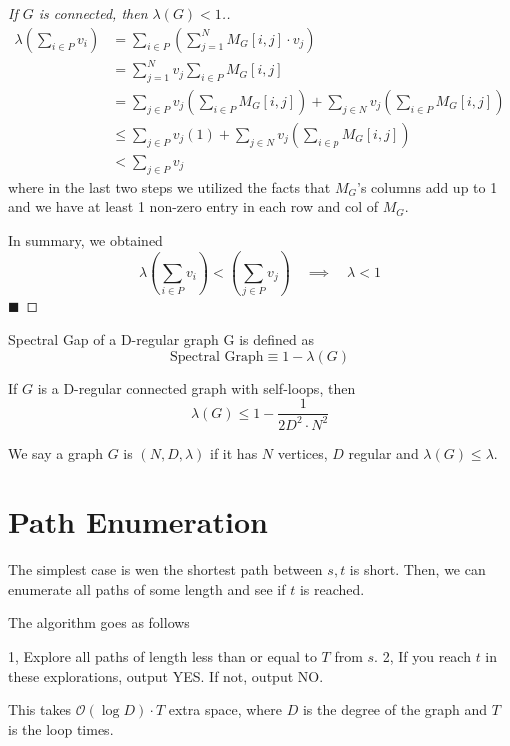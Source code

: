 \documentclass[11pt, letter]{book}
\newcommand{\qed}{\hfill $\blacksquare$}
\begin{document}
\begin{proof} [If $G$ is connected, then $\lambda(G) < 1$.]
\begin{align}
	\lambda \left( \sum_{i \in P} v_i \right) 
	&= \sum_{i \in P} \left( \sum_{j = 1}^N M_G[i, j] \cdot v_j \right) \\
	&= \sum_{j = 1}^N v_j \sum_{i \in P} M_G[i, j] \\
	&= \sum_{j \in P} v_j \left( \sum_{i \in P} M_G[i, j] \right) + \sum_{j \in N} v_j \left( \sum_{i \in P} M_G[i, j] \right) \\
	&\leq \sum_{j \in P} v_j (1) + \sum_{j \in N} v_j \left( \sum_{i \in p} M_G[i, j] \right) \\
	&< \sum_{j \in P} v_j
\end{align}
where in the last two steps we utilized the facts that $M_G$'s columns add up to 1 and we have at least 1 non-zero entry in each row and col of $M_G$. 

In summary, we obtained
\begin{equation}
	\lambda \left( \sum_{i \in P} v_i \right) < \left( \sum_{j \in P} v_j \right) \quad \implies \quad \lambda < 1
\end{equation}
\qed

\end{proof}

\begin{definition}
	Spectral Gap of a D-regular graph G is defined as 
	\begin{equation}
		\text{Spectral Graph} 
		\equiv 1 - \lambda(G)
	\end{equation}
\end{definition}

\begin{lemma}
	If $G$ is a D-regular connected graph with self-loops, then
	\begin{equation}
		\lambda (G) \leq 1 - \frac{1}{2D^2 \cdot N^2}
	\end{equation}
\end{lemma}

\begin{definition}
	We say a graph $G$ is $(N, D, \lambda)$ if it has $N$ vertices, $D$ regular and $\lambda(G) \leq \lambda$. 
\end{definition}


\section{Path Enumeration}
The simplest case is wen the shortest path between $s, t$ is short. Then, we can enumerate all paths of some length and see if $t$ is reached. 

The algorithm goes as follows
\begin{algorithm}
	1, Explore all paths of length less than or equal to $T$ from $s$. 2, If you reach $t$ in these explorations, output YES. If not, output NO. 
\end{algorithm}
This takes $\mathcal O (\log D) \cdot T$ extra space, where $D$ is the degree of the graph and $T$ is the loop times. 
\end{document}
